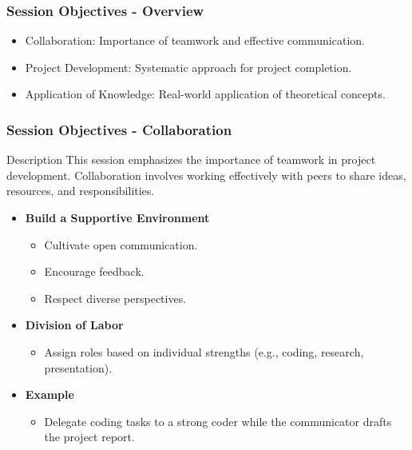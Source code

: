 \documentclass[aspectratio=169]{beamer}
\begin{document}
\begin{frame}[fragile]
    \frametitle{Session Objectives - Overview}
    \begin{itemize}
        \item Collaboration: Importance of teamwork and effective communication.
        \item Project Development: Systematic approach for project completion.
        \item Application of Knowledge: Real-world application of theoretical concepts.
    \end{itemize}
\end{frame}

\begin{frame}[fragile]
    \frametitle{Session Objectives - Collaboration}
    \begin{block}{Description}
        This session emphasizes the importance of teamwork in project development. Collaboration involves working effectively with peers to share ideas, resources, and responsibilities.
    \end{block}
    \begin{itemize}
        \item \textbf{Build a Supportive Environment}
            \begin{itemize}
                \item Cultivate open communication.
                \item Encourage feedback.
                \item Respect diverse perspectives.
            \end{itemize}
        \item \textbf{Division of Labor}
            \begin{itemize}
                \item Assign roles based on individual strengths (e.g., coding, research, presentation).
            \end{itemize}
        \item \textbf{Example}
            \begin{itemize}
                \item Delegate coding tasks to a strong coder while the communicator drafts the project report.
            \end{itemize}
    \end{itemize}
\end{frame}
\end{document}
